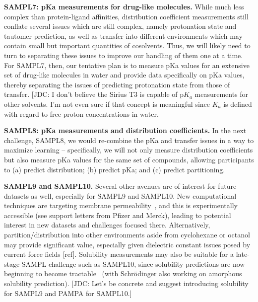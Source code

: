 \documentclass[11pt]{article}
\begin{document}
{\bf SAMPL7: pKa measurements for drug-like molecules.} 
While much less complex than protein-ligand affinities, distribution coefficient measurements still conflate several issues which are still complex, namely protonation state and tautomer prediction, as well as transfer into different environments which may contain small but important quantities of cosolvents. 
Thus, we will likely need to turn to separating these issues to improve our handling of them one at a time. 
For SAMPL7, then, our tentative plan is to measure pKa values for an extensive set of drug-like molecules in water and 
provide data specifically on pKa values, thereby separating the issues of predicting protonation state from those of transfer.
{\color{red}[JDC: I don't believe the Sirius T3 is capable of p$K_a$ measurements for other solvents. I'm not even sure if that concept is meaningful since $K_a$ is defined with regard to free proton concentrations in water.}

{\bf SAMPL8: pKa measurements and distribution coefficients.}
In the next challenge, SAMPL8, we would re-combine the pKa and transfer issues in a way to maximize learning -- specifically, we will not only measure distribution coefficients but also measure pKa values for the same set of compounds, allowing participants to (a) predict distribution; (b) predict pKa; and (c) predict partitioning.

{\bf SAMPL9 and SAMPL10.}
Several other avenues are of interest for future datasets as well, especially for SAMPL9 and SAMPL10.
New computational techniques are targeting membrane permeability~\cite{lee_permeability_2016, comer_permeability_2014}, and this is experimentally accessible (see support letters from Pfizer and Merck), leading to potential interest in new datasets and challenges focused there.
Alternatively, partition/distribution into other environments aside from cyclohexane or octanol may provide significant value, especially given dielectric constant issues posed by current force fields [ref].
Solubility measurements may also be suitable for a late-stage SAMPL challenge such as SAMPL10, since solubility predictions are now beginning to become tractable~\cite{schnieders_structure_2012, park_absolute_2014, liu_using_2016} (with Schr\"{o}dinger also working on amorphous solubility prediction).
{\color{red}[JDC: Let's be concrete and suggest introducing solubility for SAMPL9 and PAMPA for SAMPL10.]}
  
\end{document}
